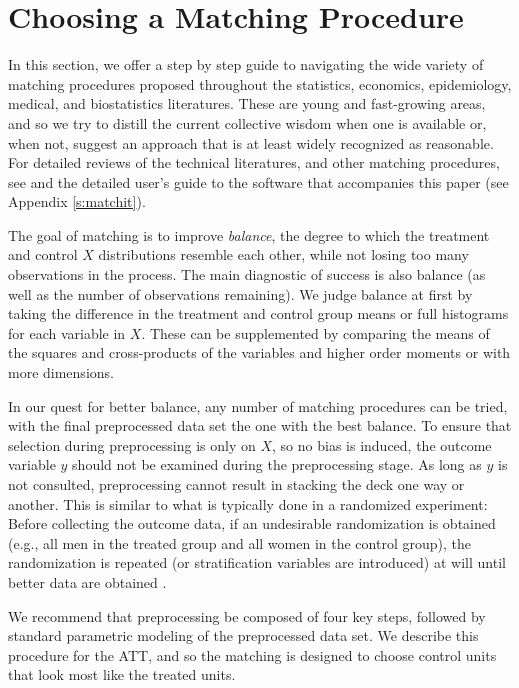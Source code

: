 \documentclass[11pt,titlepage]{article}
\begin{document}
\section{Choosing a Matching Procedure}\label{s:choose}

In this section, we offer a step by step guide to navigating the wide
variety of matching procedures proposed throughout the statistics,
economics, epidemiology, medical, and biostatistics literatures.
These are young and fast-growing areas, and so we try to distill the
current collective wisdom when one is available or, when not, suggest
an approach that is at least widely recognized as reasonable.  For
detailed reviews of the technical literatures, and other matching
procedures, see \citep{Imbens04,Rosenbaum02,Stuart04} and the detailed
user's guide to the software that accompanies this paper (see Appendix
\ref{s:matchit}).

The goal of matching is to improve \emph{balance}, the degree to which
the treatment and control $X$ distributions resemble each other, while
not losing too many observations in the process.  The main diagnostic
of success is also balance (as well as the number of observations
remaining).  We judge balance at first by taking the difference in the
treatment and control group means or full histograms for each variable
in $X$.  These can be supplemented by comparing the means of the
squares and cross-products of the variables and higher order moments
or with more dimensions.

In our quest for better balance, any number of matching procedures can
be tried, with the final preprocessed data set the one with the best
balance.  To ensure that selection during preprocessing is only on
$X$, so no bias is induced, the outcome variable $y$ should not be
examined during the preprocessing stage.  As long as $y$ is not
consulted, preprocessing cannot result in stacking the deck one way or
another.  This is similar to what is typically done in a randomized
experiment: Before collecting the outcome data, if an undesirable
randomization is obtained (e.g., all men in the treated group and all
women in the control group), the randomization is repeated (or
stratification variables are introduced) at will until better data are
obtained \citep[see][]{Rubin01}.

We recommend that preprocessing be composed of four key steps,
followed by standard parametric modeling of the preprocessed data set.
We describe this procedure for the ATT, and so the matching is
designed to choose control units that look most like the treated
units.
\end{document}
